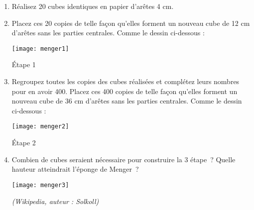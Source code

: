 
\begin{TP}


\begin{enumerate}
 \item Réalisez 20 cubes identiques en papier d'arêtes 4 cm.
 \item Placez ces 20 copies de telle façon qu'elles forment un nouveau cube de 12 cm d'arêtes  sans les parties centrales. Comme le dessin ci-dessous :
 \begin{center} \texttt{[image: menger1]} \end{center}
 \begin{center} Étape 1 \end{center}
 \item Regroupez toutes les copies des cubes réalisées et complétez leurs nombres pour en avoir 400. Placez ces 400 copies de telle façon qu'elles forment un nouveau cube de 36 cm d'arêtes  sans les parties centrales. Comme le dessin ci-dessous :
 \begin{center} \texttt{[image: menger2]} \end{center}
 \begin{center} Étape 2 \end{center}
 \item Combien de cubes seraient nécessaire pour construire la 3 étape ? Quelle hauteur atteindrait l'éponge de Menger ?
 \begin{center} \texttt{[image: menger3]} \end{center}
 \qquad \qquad \qquad \qquad \qquad \qquad \qquad \qquad \qquad \qquad \small{\emph{(Wikipedia, auteur : Solkoll)}}
 \end{enumerate}



\end{TP}
